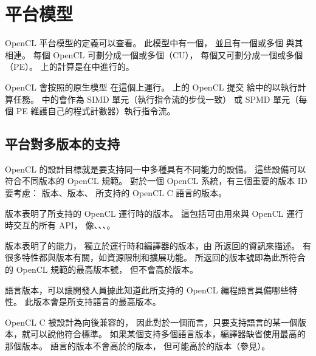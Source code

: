 \section{平台模型}

OpenCL 平台模型的定義可以查看。
此模型中有一個，
並且有一個或多個 {} 與其相連。
每個 OpenCL 可劃分成一個或多個（CU），
每個又可劃分成一個或多個（PE）。
上的計算是在中進行的。


{}

OpenCL 會按照的原生模型
在這個上運行。
上的 OpenCL 提交
給中的以執行計算任務。
中的會作為 SIMD 單元（執行指令流的步伐一致）
或 SPMD 單元（每個 PE 維護自己的程式計數器）執行指令流。

\subsection{平台對多版本的支持}
OpenCL 的設計目標就是要支持同一中多種具有不同能力的設備。
這些設備可以符合不同版本的 OpenCL 規範。
對於一個 OpenCL 系統，有三個重要的版本 ID 要考慮：
版本、版本、
所支持的 OpenCL C 語言的版本。

版本表明了所支持的 OpenCL 運行時的版本。
這包括可由用來與 OpenCL 運行時交互的所有 API，
像、、、。

版本表明了的能力，
獨立於運行時和編譯器的版本，由  所返回的資訊來描述。
有很多特性都與版本有關，如資源限制和擴展功能。
所返回的版本號即為此所符合的 OpenCL 規範的最高版本號，
但不會高於版本。

語言版本，可以讓開發人員據此知道此所支持的 OpenCL 編程語言具備哪些特性。
此版本會是所支持語言的最高版本。

OpenCL C 被設計為向後兼容的，
因此對於一個而言，只要支持語言的某一個版本，就可以說他符合標準。
如果某個支持多個語言版本，編譯器缺省使用最高的那個版本。
語言的版本不會高於的版本，
但可能高於的版本（參見）。

